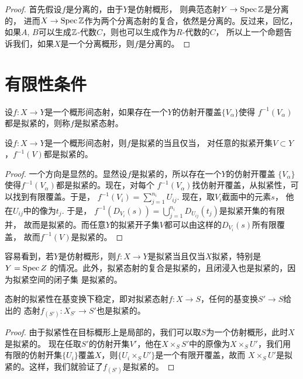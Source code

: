 \begin{proof}
首先假设$f$是分离的，由于$Y$是仿射概形，
则典范态射$Y\to \operatorname{Spec} \mathbb{Z}$是分离的，
进而$X\to\operatorname{Spec} \mathbb{Z}$作为两个分离态射的复合，依然是分离的。反过来，回忆，
如果$A$, $B$可以生成$\mathbb{Z}$-代数$C$，则也可以生成作为$R$-代数的$C$，
所以上一个命题告诉我们，如果$X$是一个分离概形，则$f$是分离的。
\end{proof}


\section{有限性条件}

\begin{para}[拟紧态射]
设$f:X\to Y$是一个概形间态射，如果存在一个$Y$的仿射开覆盖$\{V_\alpha\}$使得
$f^{-1}(V_\alpha)$都是拟紧的，则称$f$是拟紧态射。
\end{para}

\begin{pro}
	设$f:X\to Y$是一个概形间态射，则$f$是拟紧的当且仅当，
	对任意的拟紧开集$V\subset Y$，$f^{-1}(V)$都是拟紧的。
\end{pro}

\begin{proof}
	一个方向是显然的。显然设$f$是拟紧的，所以存在一个$Y$的仿射开覆盖
	$\{V_\alpha\}$使得$f^{-1}(V_\alpha)$都是拟紧的。现在，对每个
	$f^{-1}(V_\alpha)$找仿射开覆盖，从拟紧性，可以找到有限覆盖。于是，
	$f^{-1}(V_i)=\sum_{j=1}^{n_i}U_{ij}$. 现在，取$V_i$截面中的元素$s$，
	他在$U_{ij}$中的像为$t_j$. 于是，
	$f^{-1}(D_{V_i}(s))=\bigcup_{j=1}^{n_i}D_{U_{ij}}(t_j)$是拟紧开集的有限并，
	故而是拟紧的。而任意$Y$的拟紧开子集$V$都可以由这样的$D_{V_i}(s)$所有限覆盖，
	故而$f^{-1}(V)$是拟紧的。
\end{proof}

容易看到，若$Y$是仿射概形，则$f:X\to Y$是拟紧当且仅当$X$拟紧，特别是$Y=\operatorname{Spec} Z$
的情况。此外，拟紧态射的复合是拟紧的，且闭浸入也是拟紧的，因为拟紧空间的闭子集
是拟紧的。

\begin{pro}
态射的拟紧性在基变换下稳定，即对拟紧态射$f:X\to S$，任何的基变换$S'\to S$给出的
态射$f_{(S')}:X_{S'}\to S'$也是拟紧的。
\end{pro}

\begin{proof}
由于拟紧性在目标概形上是局部的，我们可以取$S$为一个仿射概形，此时$X$是拟紧的。
现在任取$S'$的仿射开集$V'$，他在$X\times_S S'$中的原像为$X\times_S U'$，我们用
有限的仿射开集$\{U_i\}$覆盖$X$，则$\{U_i\times_S U'\}$是一个有限开覆盖，故而
$X\times_S U'$是拟紧的。这样，我们就验证了$f_{(S')}$是拟紧的。
\end{proof}

